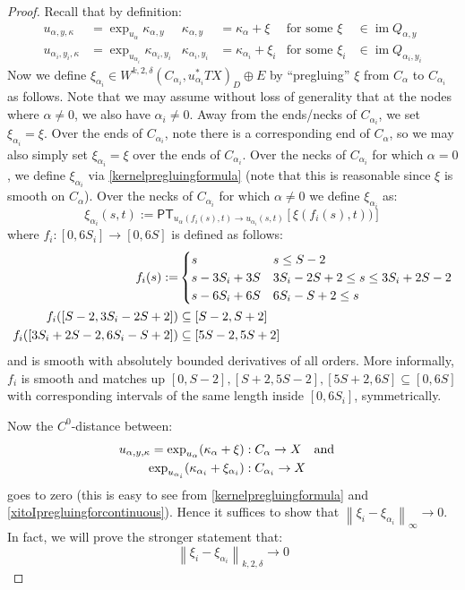 \documentclass[12pt]{article}
\theoremstyle{definition}
\theoremstyle{remark}
\numberwithin{equation}{subsection}
\newcommand{\PT}{\mathsf{PT}}
\newcommand{\im}{\operatorname{im}}
\begin{document}
\begin{proof}
Recall that by definition:
\begin{align}
u_{\alpha,y,\kappa}&=\exp_{u_\alpha}\kappa_{\alpha,y}&\kappa_{\alpha,y}&=\kappa_\alpha+\xi&\text{for some }\xi&\in\im Q_{\alpha,y}\\
u_{\alpha_i,y_i,\kappa}&=\exp_{u_{\alpha_i}}\kappa_{\alpha_i,y_i}&\kappa_{\alpha_i,y_i}&=\kappa_{\alpha_i}+\xi_i&\text{for some }\xi_i&\in\im Q_{\alpha_i,y_i}
\end{align}
Now we define $\xi_{\alpha_i}\in W^{k,2,\delta}(C_{\alpha_i},u_{\alpha_i}^\ast TX)_D\oplus E$ by ``pregluing'' $\xi$ from $C_\alpha$ to $C_{\alpha_i}$ as follows.  Note that we may assume without loss of generality that at the nodes where $\alpha\ne 0$, we also have $\alpha_i\ne 0$.  Away from the ends/necks of $C_{\alpha_i}$, we set $\xi_{\alpha_i}=\xi$.  Over the ends of $C_{\alpha_i}$, note there is a corresponding end of $C_\alpha$, so we may also simply set $\xi_{\alpha_i}=\xi$ over the ends of $C_{\alpha_i}$.  Over the necks of $C_{\alpha_i}$ for which $\alpha=0$, we define $\xi_{\alpha_i}$ via \eqref{kernelpregluingformula} (note that this is reasonable since $\xi$ is smooth on $C_{\alpha}$).  Over the necks of $C_{\alpha_i}$ for which $\alpha\ne 0$ we define $\xi_{\alpha_i}$ as:
\begin{equation}\label{xitoIpregluingforcontinuous}
\xi_{\alpha_i}(s,t):=\PT_{u_{\alpha}(f_i(s),t)\to u_{\alpha_i}(s,t)}[\xi(f_i(s),t))]
\end{equation}
where $f_i:[0,6S_i]\to[0,6S]$ is defined as follows:
\begin{align}
f_i(s):=&\begin{cases}
s&s\leq S-2\cr
s-3S_i+3S&3S_i-2S+2\leq s\leq 3S_i+2S-2\cr
s-6S_i+6S&6S_i-S+2\leq s\cr
\end{cases}\\
f_i([S-2,3S_i-2S+2])&\subseteq[S-2,S+2]\\
f_i([3S_i+2S-2,6S_i-S+2])&\subseteq[5S-2,5S+2]
\end{align}
and is smooth with absolutely bounded derivatives of all orders.  More informally, $f_i$ is smooth and matches up $[0,S-2],[S+2,5S-2],[5S+2,6S]\subseteq[0,6S]$ with corresponding intervals of the same length inside $[0,6S_i]$, symmetrically.

Now the $C^0$-distance between:
\begin{align}
u_{\alpha,y,\kappa}=\exp_{u_\alpha}(\kappa_\alpha+\xi)&:C_\alpha\to X\quad\text{and}\cr
\exp_{u_{\alpha_i}}(\kappa_{\alpha_i}+\xi_{\alpha_i})&:C_{\alpha_i}\to X
\end{align}
goes to zero (this is easy to see from \eqref{kernelpregluingformula} and \eqref{xitoIpregluingforcontinuous}).  Hence it suffices to show that $\left\|\xi_i-\xi_{\alpha_i}\right\|_\infty\to 0$.  In fact, we will prove the stronger statement that:
\begin{equation}\label{correctedgetsbetter}
\left\|\xi_i-\xi_{\alpha_i}\right\|_{k,2,\delta}\to 0
\end{equation}


\end{proof}
\end{document}
